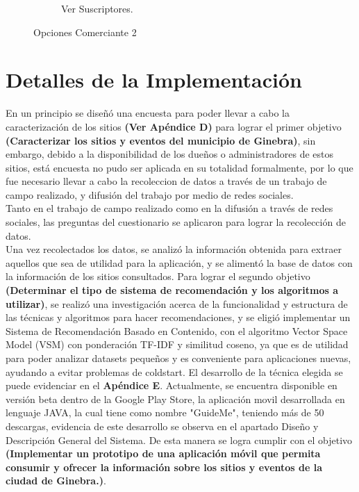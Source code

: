 \documentclass[12pt,letterpaper,openany]{book}
\begin{document}
\begin{figure}[H]
\begin{subfigure}{.4\linewidth}
        \caption{Ver Suscriptores.}
    \end{subfigure}
    \caption{Opciones Comerciante 2}
\end{figure}

\section{Detalles de la Implementación}
En un principio se diseñó una encuesta para poder llevar a cabo la caracterización de los sitios \textbf{(Ver Apéndice D)} para lograr el primer objetivo \textbf{(Caracterizar los sitios y eventos del municipio de Ginebra)}, sin embargo, debido a la disponibilidad de los dueños o administradores de estos sitios, está encuesta no pudo ser aplicada en su totalidad formalmente, por lo que fue necesario llevar a cabo la recoleccion de datos a través de un trabajo de campo realizado, y difusión del trabajo por medio de redes sociales.\\
Tanto en el trabajo de campo realizado como en la difusión a través de redes sociales, las preguntas del cuestionario se aplicaron para lograr la recolección de datos.\\
Una vez recolectados los datos, se analizó la información obtenida para extraer aquellos que sea de utilidad para la aplicación, y se alimentó la base de datos con la información de los sitios consultados.
\vspace{5mm}\newline
Para lograr el segundo objetivo \textbf{(Determinar el tipo de sistema de recomendación y los algoritmos a utilizar)}, se realizó una investigación acerca de la funcionalidad y estructura de las técnicas y algoritmos para hacer recomendaciones, y se eligió implementar un Sistema de Recomendación Basado en Contenido, con el algoritmo Vector Space Model (VSM) con ponderación TF-IDF y similitud coseno, ya que es de utilidad para poder analizar datasets pequeños y es conveniente para aplicaciones nuevas, ayudando a evitar problemas de coldstart. El desarrollo de la técnica elegida se puede evidenciar en el \textbf{Apéndice E}.
\vspace{5mm}\newline
Actualmente, se encuentra disponible en versión beta dentro de la Google Play Store, la aplicación movil desarrollada en lenguaje JAVA, la cual tiene como nombre "GuideMe",  teniendo más de 50 descargas, evidencia de este desarrollo se observa en el apartado Diseño y Descripción General del Sistema. De esta manera se logra cumplir con el objetivo \textbf{(Implementar un prototipo de una aplicación móvil que permita consumir y ofrecer la información sobre los sitios y eventos de la ciudad de Ginebra.)}.
\end{document}

